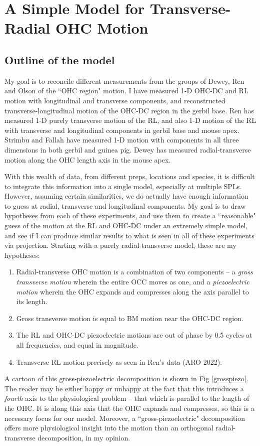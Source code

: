 \documentclass{article}
\begin{document}
\section{A Simple Model for Transverse-Radial OHC Motion}
\subsection{Outline of the model}
\par{My goal is to reconcile different measurements from the groups of Dewey, Ren and Olson of the ``OHC region" motion. I have measured 1-D OHC-DC and RL motion with longitudinal and transverse components, and reconstructed transverse-longitudinal motion of the OHC-DC region in the gerbil base. Ren has measured 1-D purely transverse motion of the RL, and also 1-D motion of the RL with transverse and longitudinal components in gerbil base and mouse apex. Strimbu and Fallah have measured 1-D motion with components in all three dimensions in both gerbil and guinea pig. Dewey has measured radial-transverse motion along the OHC length axis in the mouse apex.}
\par{With this wealth of data, from different preps, locations and species, it is difficult to integrate this information into a single model, especially at multiple SPLs. However, assuming certain similarities, we do actually have enough information to guess at radial, transverse and longitudinal components. My goal is to draw hypotheses from each of these experiments, and use them to create a ``reasonable" guess of the motion at the RL and OHC-DC under an extremely simple model, and see if I can produce similar results to what is seen in all of these experiments via projection. Starting with a purely radial-transverse model, these are my hypotheses:}
\begin{enumerate}
	\item{Radial-transverse OHC motion is a combination of two components -- a \textit{gross transverse motion} wherein the entire OCC moves as one, and a \textit{piezoelectric motion} wherein the OHC expands and compresses along the axis parallel to its length.}
	\item{Gross transverse motion is equal to BM motion near the OHC-DC region.}
	\item{The RL and OHC-DC piezoelectric motions are out of phase by 0.5 cycles at all frequencies, and equal in magnitude.}
	\item{Transverse RL motion precisely as seen in Ren's data (ARO 2022).}
\end{enumerate}
\par{A cartoon of this gross-piezoelectric decomposition is shown in Fig \ref{grosspiezo}. The reader may be either happy or unhappy at the fact that this introduces a \textit{fourth} axis to the physiological problem -- that which is parallel to the length of the OHC. It is along this axis that the OHC expands and compresses, so this is a necessary focus for our model. Moreover, a ``gross-piezoelectric" decomposition offers more physiological insight into the motion than an orthogonal radial-transverse decomposition, in my opinion.}
\end{document}
